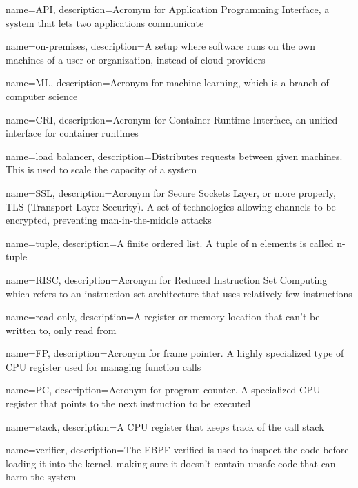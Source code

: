 {
    name=API,
    description={Acronym for Application Programming Interface, a system that lets two applications communicate}
}

{
    name=on-premises,
    description={A setup where software runs on the own machines of a user or organization, instead of cloud providers}
}

{
    name=ML,
    description={Acronym for machine learning, which is a branch of computer science}
}

{
    name=CRI,
    description={Acronym for Container Runtime Interface, an unified interface for container runtimes}
}

{
    name=load balancer,
    description={Distributes requests between given machines. This is used to scale the capacity of a system}
}

{
    name=SSL,
    description={Acronym for Secure Sockets Layer, or more properly, TLS (Transport Layer Security). A set of technologies allowing channels to be encrypted, preventing man-in-the-middle attacks}
}

{
    name=tuple,
    description={A finite ordered list. A tuple of n elements is called n-tuple}
}

{
    name=RISC,
    description={Acronym for Reduced Instruction Set Computing which refers to an instruction set architecture that uses relatively few instructions}
}

{
    name=read-only,
    description={A register or memory location that can't be written to, only read from}
}

{
    name=FP,
    description={Acronym for frame pointer. A highly specialized type of CPU register used for managing function calls}
}

{
    name=PC,
    description={Acronym for program counter. A specialized CPU register that points to the next instruction to be executed}
}

{
    name=stack,
    description={A CPU register that keeps track of the call stack}
}

{
    name=verifier,
    description={The EBPF verified is used to inspect the code before loading it into the kernel, making sure it doesn't contain unsafe code that can harm the system}
}


